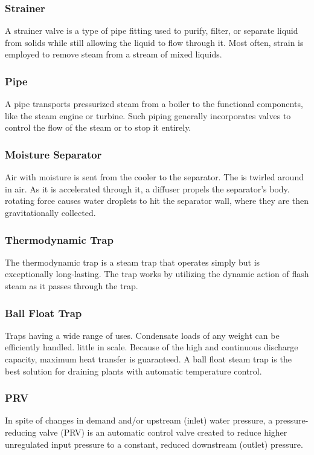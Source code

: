 \subsubsection{Strainer}
A strainer valve is a type of pipe fitting used to purify, filter, or separate liquid from solids while still allowing the liquid to flow through it. Most often, strain is employed to remove steam from a stream of mixed liquids.

\subsubsection{Pipe}
A pipe transports pressurized steam from a boiler to the functional components, like the steam engine or turbine. Such piping generally incorporates valves to control the flow of the steam or to stop it entirely.

\subsubsection{Moisture Separator}
Air with moisture is sent from the cooler to the separator. The is twirled around in air. As it is accelerated through it, a diffuser propels the separator's body. rotating force causes water droplets to hit the separator wall, where they are then gravitationally collected.

\subsubsection{Thermodynamic Trap}
The thermodynamic trap is a steam trap that operates simply but is exceptionally long-lasting. The trap works by utilizing the dynamic action of flash steam as it passes through the trap.

\subsubsection{Ball Float Trap}
Traps having a wide range of uses. Condensate loads of any weight can be efficiently handled. little in scale. Because of the high and continuous discharge capacity, maximum heat transfer is guaranteed. A ball float steam trap is the best solution for draining plants with automatic temperature control.

\subsubsection{PRV}
In spite of changes in demand and/or upstream (inlet) water pressure, a pressure-reducing valve (PRV) is an automatic control valve created to reduce higher unregulated input pressure to a constant, reduced downstream (outlet) pressure.

